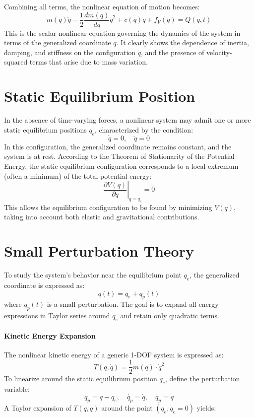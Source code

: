 Combining all terms, the nonlinear equation of motion becomes:
\[
m(q) \ddot{q} - \frac{1}{2} \frac{d m(q)}{d q} \dot{q}^2 + c(q) \dot{q} + f_V(q) = Q(q,t)
\]
This is the scalar nonlinear equation governing the dynamics of the system in terms of the generalized coordinate \( q \). It clearly shows the dependence of inertia, damping, and stiffness on the configuration \( q \), and the presence of velocity-squared terms that arise due to mass variation.

\section{Static Equilibrium Position}

In the absence of time-varying forces, a nonlinear system may admit one or more static equilibrium positions \( q_e \), characterized by the condition:
\[
\dot{q} = 0, \quad \ddot{q} = 0
\]
In this configuration, the generalized coordinate remains constant, and the system is at rest. According to the Theorem of Stationarity of the Potential Energy, the static equilibrium configuration corresponds to a local extremum (often a minimum) of the total potential energy:
\[
\left. \frac{\partial V(q)}{\partial q} \right|_{q = q_e} = 0
\]
This allows the equilibrium configuration to be found by minimizing \( V(q) \), taking into account both elastic and gravitational contributions.

\section{Small Perturbation Theory}

To study the system’s behavior near the equilibrium point \( q_e \), the generalized coordinate is expressed as:
\[
q(t) = q_e + q_p(t)
\]
where \( q_p(t) \) is a small perturbation. The goal is to expand all energy expressions in Taylor series around \( q_e \) and retain only quadratic terms.

\paragraph{Kinetic Energy Expansion}

The nonlinear kinetic energy of a generic 1-DOF system is expressed as:
\[
T(q, \dot{q}) = \frac{1}{2} m(q) \cdot \dot{q}^2
\]
To linearize around the static equilibrium position \( q_e \), define the perturbation variable:
\[
q_p = q - q_e , \quad \dot{q_p} = \dot{q} , \quad \ddot{q_p} = \ddot{q}
\]
A Taylor expansion of \( T(q, \dot{q}) \) around the point \( (q_e, \dot{q}_e = 0) \) yields:

